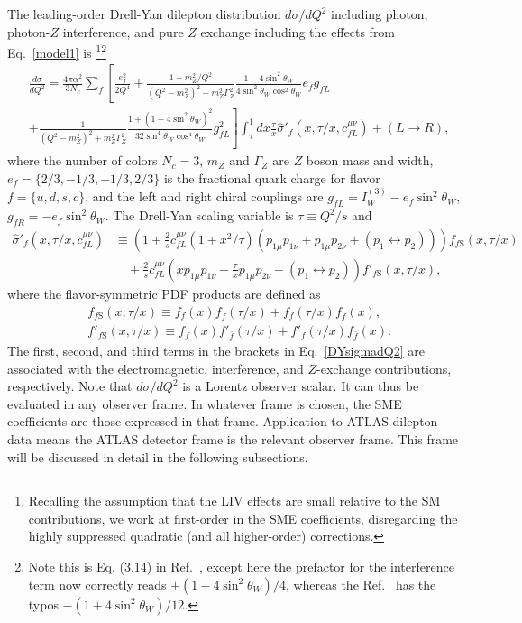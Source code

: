 The leading-order Drell-Yan dilepton distribution
$d\sigma/dQ^2$ including photon, 
photon-$Z$ interference, and pure $Z$ exchange including 
the effects from Eq.~\eqref{model1} is \footnote{Recalling the assumption that the LIV effects are small relative to the SM contributions, we work at 
first-order in the SME coefficients, disregarding 
the highly suppressed quadratic (and all higher-order) corrections.}\footnote{Note this is Eq. (3.14) in Ref.~\cite{lssv21}, except here
the prefactor for the interference term now correctly
reads $+(1-4\sin^2\theta_W)/4$, whereas the Ref.~\cite{lssv21}
has the typos $-(1+4\sin^2\theta_W)/12$.}
%
\begin{align}
\label{DYsigmadQ2}
&\frac{d\sigma}{dQ^2} =  \frac{4\pi\alpha^2}{3 N_c}
\sum_f \left[\frac{e_f^2}{2Q^4} +\frac{1-m_Z^2/Q^2}{(Q^2 -m_Z^2)^2 + m_Z^2\Gamma_Z^2} 
\frac{1-4\sin^2\theta_W}{4\sin^2
\theta_W\cos^2\theta_W}e_fg_{fL}  \right. \nonumber\\
&\left. + \frac{1}{(Q^2 -m_Z^2)^2 + m_Z^2\Gamma_Z^2}
\frac{1+(1-4\sin^2\theta_W)^2}{32\sin^4\theta_W\cos^4\theta_W}g_{fL}^2\right]
\int_{\tau}^1 dx\frac{\tau}{x}\widehat{\sigma}'_{f}
\left(x,\tau/x,c_{fL}^{\mu\nu}\right) + (L\rightarrow R),
\end{align}
%
where the number of colors $N_c = 3$, $m_Z$ and $\Gamma_Z$ are $Z$ boson mass and width, 
$e_f = \{2/3,-1/3,-1/3,2/3\}$
is the fractional quark charge for flavor $f = \{u,d,s,c\}$, and 
the left and right chiral couplings are $g_{fL} = I_W^{(3)}-e_f\sin^2\theta_W$, 
$g_{fR} = -e_f\sin^2\theta_W$.
The Drell-Yan scaling variable is $\tau \equiv Q^2/s$ and 
%
\begin{align}
\label{sigmaprime}
\widehat{\sigma}'_{f}\left(x,\tau/x, c_{fL}^{\mu\nu}\right) 
&\equiv \left( 1+ \frac{2}{s}
c_{fL}^{\mu\nu}(1+x^2/\tau)(p_{1\mu}p_{1\nu}+ p_{1\mu}p_{2\nu}
+ (p_1\leftrightarrow p_2))\right)  f_{f\text{S}}(x,\tau/x) \nonumber\\
&\quad +  \frac{2}{s}c_{fL}^{\mu\nu}\left(xp_{1\mu}p_{1\nu} 
+\frac{\tau}{x}p_{1\mu}p_{2\nu} + 
(p_1\leftrightarrow p_2) \right) f'_{f\text{S}}(x,\tau/x), 
\end{align}
%
where the flavor-symmetric PDF products are defined as
%
\begin{align}
&f_{f\text{S}}(x,\tau/x) \equiv f_{f}(x)f_{\bar f}(\tau/x) +  f_{f}(\tau/x)f_{\bar f}(x), \label{PDFprodf}\\
&f'_{f\text{S}}(x,\tau/x) \equiv f_{f}(x)f'_{\bar f}(\tau/x) +  f'_{f}(\tau/x)f_{\bar f}(x). \label{PDFprodbarf}
\end{align}
%
The first, second, and third terms 
in the brackets in Eq.~\eqref{DYsigmadQ2}
are associated with the electromagnetic, 
interference, and $Z$-exchange contributions, respectively. Note that
$d\sigma/dQ^2$ is a Lorentz observer scalar. It can thus be evaluated
in any observer frame. In whatever frame is chosen, the SME coefficients
are those expressed in that frame. 
Application to ATLAS dilepton data means the ATLAS detector frame 
is the relevant observer frame. 
This frame will be discussed in detail in the following subsections.
%
%
